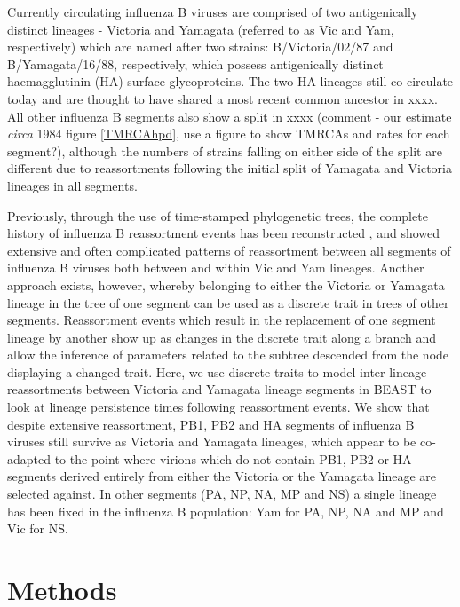 \documentclass[11pt,oneside,letterpaper]{article}
\begin{document}
Currently circulating influenza B viruses are comprised of two antigenically distinct lineages - Victoria and Yamagata (referred to as Vic and Yam, respectively) which are named after two strains: B/Victoria/02/87 and B/Yamagata/16/88, respectively, which possess antigenically distinct haemagglutinin (HA) surface glycoproteins. 
The two HA lineages still co-circulate today and are thought to have shared a most recent common ancestor in xxxx. 
All other influenza B segments also show a split in xxxx (comment - our estimate \textit{circa} 1984 figure \ref{TMRCAhpd}, use a figure to show TMRCAs and rates for each segment?), although the numbers of strains falling on either side of the split are different due to reassortments following the initial split of Yamagata and Victoria lineages in all segments.


Previously, through the use of time-stamped phylogenetic trees, the complete history of influenza B reassortment events has been reconstructed \cite{chen2008}, and showed extensive and often complicated patterns of reassortment between all segments of influenza B viruses both between and within Vic and Yam lineages.
Another approach exists, however, whereby belonging to either the Victoria or Yamagata lineage in the tree of one segment can be used as a discrete trait in trees of other segments.
Reassortment events which result in the replacement of one segment lineage by another show up as changes in the discrete trait along a branch and allow the inference of parameters related to the subtree descended from the node displaying a changed trait.
Here, we use discrete traits to model inter-lineage reassortments between Victoria and Yamagata lineage segments in BEAST to look at lineage persistence times following reassortment events. 
We show that despite extensive reassortment, PB1, PB2 and HA segments of influenza B viruses still survive as Victoria and Yamagata lineages, which appear to be co-adapted to the point where virions which do not contain PB1, PB2 or HA segments derived entirely from either the Victoria or the Yamagata lineage are selected against.
In other segments (PA, NP, NA, MP and NS) a single lineage has been fixed in the influenza B population: Yam for PA, NP, NA and MP and Vic for NS.


\section*{Methods}
\end{document}
